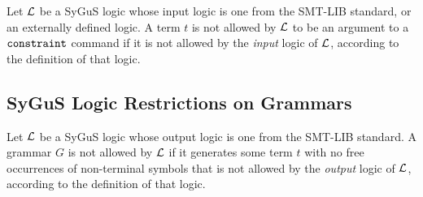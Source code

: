 \documentclass[english,a4paper,10pt]{article}
\begin{document}

Let $\mathcal{L}$ be a SyGuS logic whose input logic
is one from the SMT-LIB standard, or an externally defined logic.
A term $t$ is not allowed by $\mathcal{L}$ 
to be an argument to a $\texttt{constraint}$ command 
if it is not allowed by the \emph{input} logic of $\mathcal{L}$, 
according to the definition of that logic.



\subsection{SyGuS Logic Restrictions on Grammars}
\label{ssec:logicr-grammars}

Let $\mathcal{L}$ be a SyGuS logic whose output logic
is one from the SMT-LIB standard.
A grammar $G$ is not allowed by $\mathcal{L}$ if
it generates some term $t$ with 
no free occurrences of non-terminal
symbols that is not allowed by the \emph{output} logic of $\mathcal{L}$,
according to the definition of that logic. %
\end{document}
